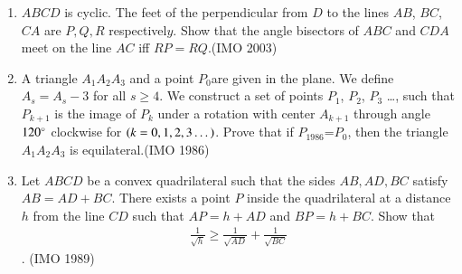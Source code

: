 \begin{enumerate}[label=\thesubsection.\arabic*,ref=\thesubsection.\theenumi]
\item $ABCD$ is cyclic. The feet of the perpendicular from $D$ to the lines $AB$, $BC$, $CA$ are $P, Q,R $ respectivel$y$. Show that the angle bisectors of $ ABC$ and $CDA$ meet on the line $AC$ iff $RP = RQ$.\hfill(IMO 2003)
\item A triangle $A_1A_2A_3$ and a point $P_0 $are given in the plane. We define $A_s
    =A_s-3$ for all $s\geq4$. We construct a set of points $P_1$, $P_2$, $P_3$ \dots, such that $P_{k+1}$ is the image of $P_k$ under a rotation with center $A_{k+1}$ through angle $120\degree$ clockwise for $\left(k=0,1,2,3\dots\right)$. Prove that if $P_{1986}$=$P_0$, then the triangle $A_1A_2A_3$ is equilateral.\hfill(IMO  1986)
%
%
	\item Let $ABCD$ be a convex quadrilateral such that the sides ${AB, AD, BC}$ satisfy $AB= AD + BC$. There exists a point $P$ inside the quadrilateral at a distance $h$ from the line $CD$ such that $AP= h+ AD$ and $BP= h + BC$. Show that \begin{align*}
	\frac{1}{\sqrt{h}}\geq\frac{1}{\sqrt{AD}}+\frac{1}{\sqrt{BC}}\end{align*}. \hfill(IMO  1989)

\end{enumerate}
